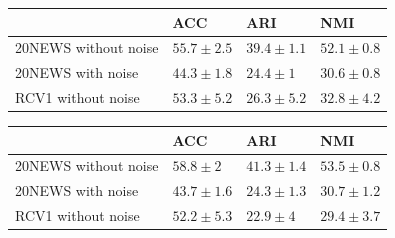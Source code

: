 \begin{table}[h]
\begin{tabular}{|l|l|l|l|}
  \end{tabular}
  \begin{tabular}{|l|l|l|l|}
    \hline
    & ACC                  &ARI                   & NMI                   \\ \hline
    20NEWS without noise   &$55.7\pm 2.5$  &$39.4\pm 1.1$    &$52.1\pm 0.8$ \\ \hline
    20NEWS with noise      &$44.3\pm 1.8$  &\boldmath$24.4\pm 1$&$30.6\pm 0.8$ \\ \hline
    RCV1 without noise     &$53.3\pm 5.2$&$26.3\pm 5.2$&$32.8 \pm 4.2$  \\ \hline
  \end{tabular}
  \begin{tabular}{|l|l|l|l|}
    \hline
    & ACC                  &ARI                   & NMI                   \\ \hline
    20NEWS without noise   &\boldmath$58.8\pm 2$  &\boldmath$41.3\pm 1.4$    &\boldmath$53.5\pm 0.8$ \\ \hline
    20NEWS with noise      &$43.7\pm 1.6$  &$24.3\pm 1.3$&\boldmath$30.7\pm 1.2$ \\ \hline
    RCV1 without noise     &$52.2\pm 5.3$&$22.9\pm 4$&$29.4 \pm 3.7$  \\ \hline
  \end{tabular}
\end{table}

